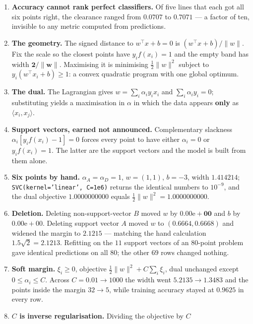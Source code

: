 \documentclass[11pt]{article}
\begin{document}
\begin{enumerate}[leftmargin=*]
  \item \textbf{Accuracy cannot rank perfect classifiers.} Of five lines that
    each got all six points right, the clearance ranged from $0.0707$ to
    $\mathbf{0.7071}$ --- a factor of ten, invisible to any metric computed
    from predictions.
  \item \textbf{The geometry.} The signed distance to $w^\top x + b = 0$ is
    $(w^\top x + b)/\|w\|$. Fix the scale so the closest points have
    $y_i f(x_i) = 1$ and the empty band has width $\mathbf{2/\|w\|}$.
    Maximising it is minimising $\tfrac12\|w\|^2$ subject to
    $y_i(w^\top x_i + b) \ge 1$: a convex quadratic program with one global
    optimum.
  \item \textbf{The dual.} The Lagrangian gives $w = \sum_i \alpha_i y_i x_i$
    and $\sum_i \alpha_i y_i = 0$; substituting yields a maximisation in
    $\alpha$ in which the data appears \textbf{only} as
    $\langle x_i, x_j\rangle$.
  \item \textbf{Support vectors, earned not announced.} Complementary
    slackness $\alpha_i[y_i f(x_i) - 1] = 0$ forces every point to have either
    $\alpha_i = 0$ or $y_i f(x_i) = 1$. The latter are the support vectors and
    the model is built from them alone.
  \item \textbf{Six points by hand.} $\alpha_A = \alpha_D = 1$, $w = (1,1)$,
    $b = -3$, width $\mathbf{1.414214}$; \texttt{SVC(kernel='linear', C=1e6)}
    returns the identical numbers to $10^{-9}$, and the dual objective
    $1.0000000000$ equals $\tfrac12\|w\|^2 = 1.0000000000$.
  \item \textbf{Deletion.} Deleting non-support-vector $B$ moved $w$ by
    $\mathbf{0.00\mathrm{e}{+}00}$ and $b$ by $0.00\mathrm{e}{+}00$. Deleting
    support vector $A$ moved $w$ to $(0.6664, 0.6668)$ and widened the margin
    to $2.1215$ --- matching the hand calculation $1.5\sqrt2 = 2.1213$.
    Refitting on the $11$ support vectors of an $80$-point problem gave
    identical predictions on all $80$; the other $69$ rows changed nothing.
  \item \textbf{Soft margin.} $\xi_i \ge 0$, objective
    $\tfrac12\|w\|^2 + C\sum_i \xi_i$, dual unchanged except
    $0 \le \alpha_i \le C$. Across $C = 0.01 \to 1000$ the width went
    $5.2135 \to 1.3483$ and the points inside the margin $32 \to 5$, while
    training accuracy stayed at $0.9625$ in every row.
  \item \textbf{$C$ is inverse regularisation.} Dividing the objective by $C$

\end{enumerate}
\end{document}
